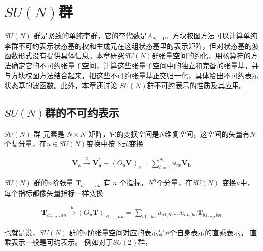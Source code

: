 \setcounter{chapter}{7}

\chapter{$SU(N)$群}

$SU(N)$ 群是紧致的单纯李群，它的李代数是$A_{N-1}$。方块权图方法可以计算单纯李群不可约表示状态基的权和生成元在这组状态基里的表示矩阵，但对状态基的波函数形式没有提供具体信息。本章研究$SU(N)$群张量空间的约化，用杨算符的方法确定它的不可约张量子空间，计算这些张量子空间中的独立和完备的张量基，并与方块权图方法结合起来，把这些不可约张量基正交归一化，具体给出不可约表示状态基的波函数。此外，本章还讨论 $SU(N)​$群不可约表示的性质及其应用。

\section{$SU(N)$群的不可约表示}

$SU(N)$ 群 元素是 $N \times N$ 矩阵，它的变换空间是$N$维复空间，这空间的矢量有$N$个复分量，在$u \in SU(N)$变换中按下式变换

\begin{newprop}
\begin{equation}\begin{aligned}
\label{eq.8.1.1}
\mathbf{V_a}  \stackrel{u}{\to} 
\mathbf{V^\prime_a} \equiv (O_u \mathbf{V})_a=
\sum\limits_{b=1}^N u_{ab} \mathbf{V_b}
\end{aligned}\end{equation}
\end{newprop}


$SU(N)$ 群的$n$阶张量 $\mathbf{T}_{a1,\ldots,an}$ 有 $n$ 个指标，$N^n$个分量，在$SU(N)$ 变换$u$中，每个指标都像矢量指标一样变换

\begin{newprop}
\begin{equation}\begin{aligned}
\label{eq.8.1.2}
\mathbf{T}_{a1,\ldots,an} \stackrel{u}{\to} 
(O_u \mathbf{T})_{a1,\ldots,an}=\sum\limits_{b1\ldots bn}
u_{a1,b1}\ldots u_{an,bn}\mathbf{T}_{b1,\ldots,bn}
\end{aligned}\end{equation}
\end{newprop}

也就是说，$SU(N)$ 群的$n$阶张量空间对应的表示是$n$个自身表示的直乘表示。
直乘表示一般是可约表示。
例如对于$SU(2)$群，

